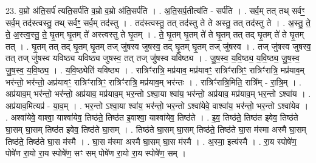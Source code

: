 \documentclass[17pt]{extarticle}
\begin{document}
23. व॒म्रो अ॑ति॒सर्प॑ त्यति॒सर्प॑ति व॒म्रो व॒म्रो अ॑ति॒सर्प॑ति । . अ॒ति॒सर्प॒तीत्य॑ति - सर्प॑ति । . सर्व॒म् तत् तथ् सर्वꣳ॒॒ सर्व॒म् तद॑स्त्वस्तु॒ तथ् सर्वꣳ॒॒ सर्व॒म् तद॑स्तु । . तद॑स्त्वस्तु॒ तत् तद॑स्तु ते ते अस्तु॒ तत् तद॑स्तु ते । . अ॒स्तु॒ ते॒ ते॒ अ॒स्त्व॒स्तु॒ ते॒ घृ॒तम् घृ॒तम् ते॑ अस्त्वस्तु ते घृ॒तम् । . ते॒ घृ॒तम् घृ॒तम् ते॑ ते घृ॒तम् तत् तद् घृ॒तम् ते॑ ते घृ॒तम् तत् । . घृ॒तम् तत् तद् घृ॒तम् घृ॒तम् तज् जु॑षस्व जुषस्व॒ तद् घृ॒तम् घृ॒तम् तज् जु॑षस्व । . तज् जु॑षस्व जुषस्व॒ तत् तज् जु॑षस्व यविष्ठ्य यविष्ठ्य जुषस्व॒ तत् तज् जु॑षस्व यविष्ठ्य । . जु॒ष॒स्व॒ य॒वि॒ष्ठ्य॒ य॒वि॒ष्ठ्य॒ जु॒ष॒स्व॒ जु॒ष॒स्व॒ य॒वि॒ष्ठ्य॒ । . य॒वि॒ष्ठ्येति॑ यविष्ठ्य । . रात्रिꣳ॑रात्रि॒ मप्र॑याव॒ मप्र॑यावꣳ॒॒ रात्रिꣳ॑रात्रिꣳ॒॒ रात्रिꣳ॑रात्रि॒ मप्र॑याव॒म् भर॑न्तो॒ भर॑न्तो॒ अप्र॑यावꣳ॒॒ रात्रिꣳ॑रात्रिꣳ॒॒ रात्रिꣳ॑रात्रि॒ मप्र॑याव॒म् भर॑न्तः । . रात्रिꣳ॑रात्रि॒मिति॒ रात्रि᳚म् - रा॒त्रि॒म् । . अप्र॑याव॒म् भर॑न्तो॒ भर॑न्तो॒ अप्र॑याव॒ मप्र॑याव॒म् भर॒न्तो ऽश्वा॒या श्वा॑य॒ भर॑न्तो॒ अप्र॑याव॒ मप्र॑याव॒म् भर॒न्तो ऽश्वा॑य । . अप्र॑याव॒मित्यप्र॑ - या॒व॒म् । . भर॒न्तो ऽश्वा॒या श्वा॑य॒ भर॑न्तो॒ भर॒न्तो ऽश्वा॑येवे॒ वाश्वा॑य॒ भर॑न्तो॒ भर॒न्तो ऽश्वा॑येव । . अश्वा॑येवे॒ वाश्वा॒ याश्वा॑येव॒ तिष्ठ॑ते॒ तिष्ठ॑त इ॒वाश्वा॒ याश्वा॑येव॒ तिष्ठ॑ते । . इ॒व॒ तिष्ठ॑ते॒ तिष्ठ॑त इवेव॒ तिष्ठ॑ते घा॒सम् घा॒सम् तिष्ठ॑त इवेव॒ तिष्ठ॑ते घा॒सम् । . तिष्ठ॑ते घा॒सम् घा॒सम् तिष्ठ॑ते॒ तिष्ठ॑ते घा॒स म॑स्मा अस्मै घा॒सम् तिष्ठ॑ते॒ तिष्ठ॑ते घा॒स म॑स्मै । . घा॒स म॑स्मा अस्मै घा॒सम् घा॒स म॑स्मै । . अ॒स्मा॒ इत्य॑स्मै । . रा॒य स्पोषे॑ण॒ पोषे॑ण रा॒यो रा॒य स्पोषे॑ण॒ सꣳ सम् पोषे॑ण रा॒यो रा॒य स्पोषे॑ण॒ सम् । \newline
\end{document}
